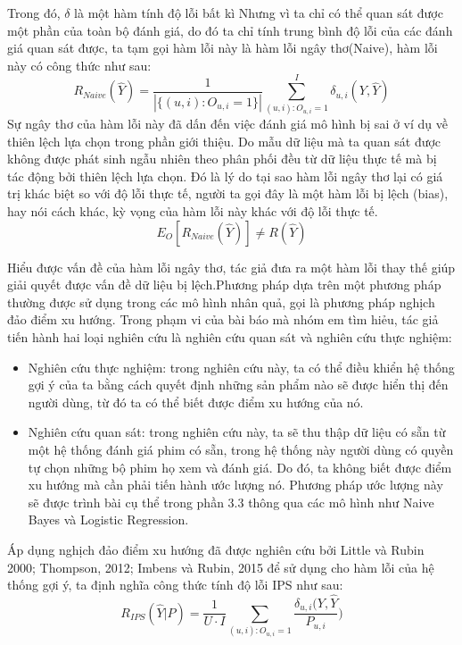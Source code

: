 Trong đó, $\delta$ là một hàm tính độ lỗi bất kì
Nhưng vì ta chỉ có thể quan sát được một phần của toàn bộ đánh giá, do đó ta chỉ tính trung bình độ lỗi của các đánh giá quan sát được, ta tạm gọi hàm lỗi này là hàm lỗi ngây thơ(Naive), hàm lỗi này có công thức như sau:
\begin{equation}
\label{eq:naive}
R_{Naive}(\hat{Y}) = \frac{1}{|\{(u,i):O_{u,i} = 1\}|} \sum_{(u,i):O_{u,i}=1}^{I} \delta_{u,i}(Y,\hat{Y}) 
\end{equation}
Sự ngây thơ của hàm lỗi này đã dấn đến việc đánh giá mô hình bị sai ở ví dụ về thiên lệch lựa chọn trong phần giới thiệu. Do mẫu dữ liệu mà ta quan sát được không được phát sinh ngẫu nhiên theo phân phối đều từ dữ liệu thực tế mà bị tác động bởi thiên lệch lựa chọn. Đó là lý do tại sao hàm lỗi ngây thơ lại có giá trị khác biệt so với độ lỗi thực tế, người ta gọi đây là một hàm lỗi bị lệch (bias), hay nói cách khác, kỳ vọng của hàm lỗi này khác với độ lỗi thực tế.
\[E_O [R_{Naive} (\hat{Y})] \ne R(\hat{Y})\]

Hiểu được vấn đề của hàm lỗi ngây thơ, tác giả đưa ra một hàm lỗi thay thế giúp giải quyết được vấn đề dữ liệu bị lệch.Phương pháp dựa trên một phương pháp thường được sử dụng trong các mô hình nhân quả, gọi là phương pháp nghịch đảo điểm xu hướng. Trong phạm vi của bài báo mà nhóm em tìm hiẻu, tác giả tiến hành hai loại nghiên cứu là nghiên cứu quan sát và nghiên cứu thực nghiệm:
\begin{itemize}
    \item Nghiên cứu thực nghiệm: trong nghiên cứu này, ta có thể điều khiển hệ thống gợi ý của ta bằng cách quyết định những sản phẩm nào sẽ được hiển thị đến người dùng, từ đó ta có thể biết được điểm xu hướng của nó.
    \item Nghiên cứu quan sát: trong nghiên cứu này, ta sẽ thu thập dữ liệu có sẵn từ một hệ thống đánh giá phim có sẵn, trong hệ thống này người dùng có quyền tự chọn những bộ phim họ xem và đánh giá. Do đó, ta không biết được điểm xu hướng mà cần phải tiến hành ước lượng nó. Phương pháp ước lượng này sẽ được trình bài cụ thể trong phần 3.3 thông qua các mô hình như Naive Bayes và Logistic Regression.
\end{itemize}

Áp dụng nghịch đảo điểm xu hướng đã được nghiên cứu bởi Little và Rubin 2000; Thompson, 2012; Imbens và Rubin, 2015 để sử dụng cho hàm lỗi của hệ thống gợi ý, ta định nghĩa công thức tính độ lỗi IPS như sau:
\begin{equation}
\label{eq:IPS}
R_{IPS}(\hat{Y}|P) = \frac{1}{U\cdot I}\sum_{(u,i):O_{u,i}=1} \frac{\delta_{u,i}(Y,\hat{Y}}{P_{u,i}})
\end{equation}

